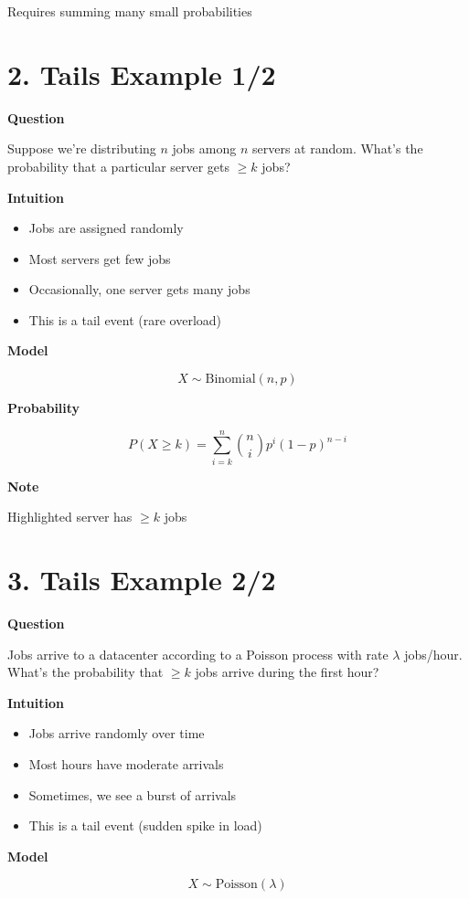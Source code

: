 \documentclass[11pt]{article}
\begin{document}
Requires summing many small probabilities

\section*{2. Tails Example 1/2}

\textbf{Question}

Suppose we’re distributing $n$ jobs among $n$ servers at random. What’s the probability that a particular server gets $\geq k$ jobs?

\textbf{Intuition}

\begin{itemize}
\item Jobs are assigned randomly
\item Most servers get few jobs
\item Occasionally, one server gets many jobs
\item This is a tail event (rare overload)
\end{itemize}

\textbf{Model}

\[
X \sim \text{Binomial}(n, p)
\]

\textbf{Probability}

\[
P(X \geq k) = \sum_{i=k}^{n} \binom{n}{i} p^i (1-p)^{n-i}
\]

\textbf{Note}

Highlighted server has $\geq k$ jobs

\section*{3. Tails Example 2/2}

\textbf{Question}

Jobs arrive to a datacenter according to a Poisson process with rate $\lambda$ jobs/hour. What’s the probability that $\geq k$ jobs arrive during the first hour?

\textbf{Intuition}

\begin{itemize}
\item Jobs arrive randomly over time
\item Most hours have moderate arrivals
\item Sometimes, we see a burst of arrivals
\item This is a tail event (sudden spike in load)
\end{itemize}

\textbf{Model}

\[
X \sim \text{Poisson}(\lambda)
\]
\end{document}

